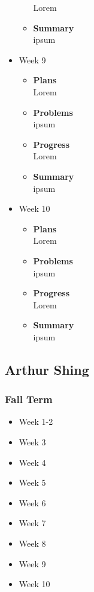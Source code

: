 \begin{itemize}
\begin{itemize}
				Lorem
				\item \textbf{Summary} \\
				ipsum
			\end{itemize}
		\item{Week 9}
			\begin{itemize}
				\item \textbf{Plans} \\
				Lorem
				\item \textbf{Problems} \\
				ipsum
				\item \textbf{Progress} \\
				Lorem
				\item \textbf{Summary} \\
				ipsum
			\end{itemize}
		\item{Week 10}
			\begin{itemize}
				\item \textbf{Plans} \\
				Lorem
				\item \textbf{Problems} \\
				ipsum
				\item \textbf{Progress} \\
				Lorem
				\item \textbf{Summary} \\
				ipsum
			\end{itemize}
	\end{itemize}

	\pagebreak


	\subsection{Arthur Shing}
	\subsubsection{Fall Term}
	\begin{itemize}
		\item{Week 1-2}
		\item{Week 3}
		\item{Week 4}
		\item{Week 5}
		\item{Week 6}
		\item{Week 7}
		\item{Week 8}
		\item{Week 9}
		\item{Week 10}
	\end{itemize}
